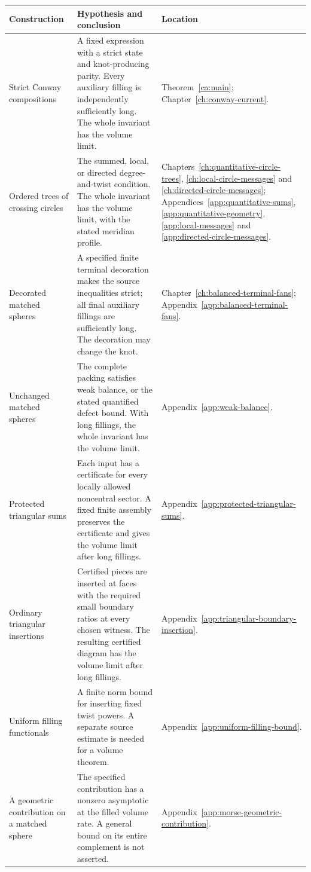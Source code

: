 {\small
\begin{longtable}{@{}p{}p{}p{}@{}}
\toprule
Construction & Hypothesis and conclusion & Location\\
\midrule
\endhead
Strict Conway compositions &
A fixed expression with a strict state and knot-producing parity.
Every auxiliary filling is independently sufficiently long.
The whole invariant has the volume limit. &
Theorem~\ref{ca:main};
Chapter~\ref{ch:conway-current}.\\[5pt]
Ordered trees of crossing circles &
The summed, local, or directed degree-and-twist condition.
The whole invariant has the volume limit, with the stated
meridian profile. &
Chapters~\ref{ch:quantitative-circle-trees},
\ref{ch:local-circle-messages} and
\ref{ch:directed-circle-messages};
Appendices~\ref{app:quantitative-sums},
\ref{app:quantitative-geometry},
\ref{app:local-messages} and
\ref{app:directed-circle-messages}.\\[5pt]
Decorated matched spheres &
A specified finite terminal decoration makes the source inequalities
strict; all final auxiliary fillings are sufficiently long.
The decoration may change the knot. &
Chapter~\ref{ch:balanced-terminal-fans};
Appendix~\ref{app:balanced-terminal-fans}.\\[5pt]
Unchanged matched spheres &
The complete packing satisfies weak balance, or the stated quantified
defect bound. With long fillings, the whole invariant has the volume
limit. &
Appendix~\ref{app:weak-balance}.\\[5pt]
Protected triangular sums &
Each input has a certificate for every locally allowed noncentral
sector. A fixed finite assembly preserves the certificate and gives
the volume limit after long fillings. &
Appendix~\ref{app:protected-triangular-sums}.\\[5pt]
Ordinary triangular insertions &
Certified pieces are inserted at faces with the required small
boundary ratios at every chosen witness. The resulting certified
diagram has the volume limit after long fillings. &
Appendix~\ref{app:triangular-boundary-insertion}.\\[5pt]
Uniform filling functionals &
A finite norm bound for inserting fixed twist powers. A separate
source estimate is needed for a volume theorem. &
Appendix~\ref{app:uniform-filling-bound}.\\[5pt]
A geometric contribution on a matched sphere &
The specified contribution has a nonzero asymptotic at the filled
volume rate. A general bound on its entire complement is not asserted. &
Appendix~\ref{app:morse-geometric-contribution}.\\
\bottomrule
\end{longtable}
}

